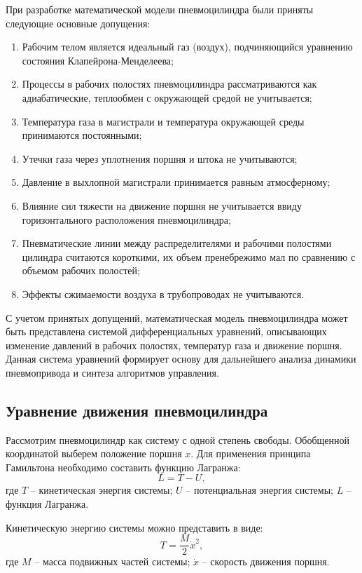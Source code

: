 При разработке математической модели пневмоцилиндра были приняты следующие основные допущения:
\begin{enumerate}
    \item Рабочим телом является идеальный газ (воздух), подчиняющийся уравнению состояния Клапейрона-Менделеева;
    \item Процессы в рабочих полостях пневмоцилиндра рассматриваются как адиабатические, теплообмен с окружающей средой не учитывается;
    \item Температура газа в магистрали и температура окружающей среды принимаются постоянными;
    \item Утечки газа через уплотнения поршня и штока не учитываются;
    \item Давление в выхлопной магистрали принимается равным атмосферному;
    \item Влияние сил тяжести на движение поршня не учитывается ввиду горизонтального расположения пневмоцилиндра;
    \item Пневматические линии между распределителями и рабочими полостями цилиндра считаются короткими,
          их объем пренебрежимо мал по сравнению с объемом рабочих полостей;
    \item Эффекты сжимаемости воздуха в трубопроводах не учитываются.
\end{enumerate}

С учетом принятых допущений, математическая модель пневмоцилиндра может быть представлена системой
дифференциальных уравнений, описывающих изменение давлений в рабочих полостях, температур газа и
движение поршня. Данная система уравнений формирует основу для дальнейшего анализа динамики пневмопривода
и синтеза алгоритмов управления.

\subsection{Уравнение движения пневмоцилиндра}\label{sec:ch2/sec2/subsec1}

Рассмотрим пневмоцилиндр как систему с одной степень свободы. Обобщенной координатой выберем положение поршня $x$.
Для применения принципа Гамильтона необходимо составить функцию Лагранжа:
\begin{equation}\label{eq:ch2/eq0}
    L = T - U,
\end{equation}
где $T$ -- кинетическая энергия системы; $U$ -- потенциальная энергия системы; $L$ -- функция Лагранжа.

Кинетическую энергию системы можно представить в виде:
\begin{equation}\label{eq:ch2/eq1}
    T = \frac{M}{2} \dot{x}^2,
\end{equation}
где $M$ -- масса подвижных частей системы; $\dot{x}$ -- скорость движения поршня.

